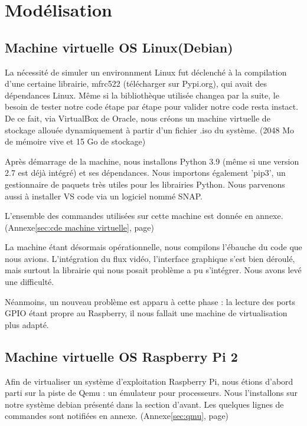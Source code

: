 \documentclass[a4paper]{report}
\begin{document}
    

    \chapter{Modélisation}
    
        \section{Machine virtuelle OS Linux(Debian)}
        
        La nécessité de simuler un environnment Linux fut déclenché à la compilation d'une
    certaine librairie, mfrc522 (télécharger sur Pypi.org), qui avait des dépendances Linux.
    M\^{e}me si la bibliothèque utilisée changea par la suite, le besoin de tester notre code
    étape par étape pour valider notre code resta instact.
    De ce fait, via VirtualBox de Oracle, nous créons un machine virtuelle de stockage allouée 
    dynamiquement à partir d'un fichier .iso du système. (2048 Mo de mémoire vive et 15 Go de stockage)

    Après démarrage de la machine, nous installons Python 3.9 (m\^{e}me si une version 2.7 est
    déjà intégré) et ses dépendances. Nous importons également 'pip3', un gestionnaire de paquets
    très utiles pour les librairies Python. Nous parvenons aussi à installer VS code via un 
    logiciel nommé SNAP.

    L'ensemble des commandes utilisées sur cette machine est donnée en annexe. (Annexe\ref{sec:cde machine virtuelle},
    page\pageref{sec:cde machine virtuelle})

    La machine étant désormais opérationnelle, nous compilons l'ébauche du code que nous avions.
    L'intégration du flux vidéo, l'interface graphique s'est bien déroulé, mais surtout
    la librairie qui nous posait problème a pu s'intégrer. Nous avons levé une difficulté.

    Néanmoins, un nouveau problème est apparu à cette phase : la lecture des ports GPIO étant
    propre au Raspberry, il nous fallait une machine de virtualisation plus adapté.
        
        \section{Machine virtuelle OS Raspberry Pi 2}
        
        Afin de virtualiser un système d'exploitation Raspberry Pi, nous étions d'abord parti sur
    la piste de Qemu : un émulateur pour processeurs. Nous l'installons sur notre système
    debian présenté dans la section d'avant.
    Les quelques lignes de commandes sont notifiées en annexe. (Annexe\ref{sec:qmu},
    page\pageref{sec:qmu})
\end{document}
